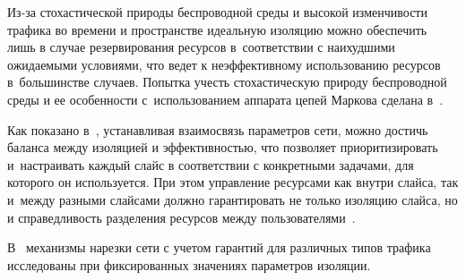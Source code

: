 \begin{multicols}{2}
Из-за стохастической природы беспроводной среды и 
высокой изменчивости трафика во времени и пространстве идеальную 
изоляцию можно обеспечить лишь в случае резервирования ресурсов 
в~соответствии с наихудшими ожидаемыми условиями, что ведет к 
неэффективному использованию ресурсов в~большинстве случаев. 
Попытка 
учесть стохастическую природу беспроводной среды и ее особенности 
с~использованием аппарата цепей Маркова сделана в~\cite{6-mos}. 

Как показано в~\cite{7-mos}, устанавливая взаимосвязь параметров сети, 
можно достичь баланса между изоляцией и эф\-фек\-тив\-ностью, что позволяет 
прио\-ри\-тизировать и~настраивать каждый слайс в со\-от\-вет\-ствии с 
конкретными задачами, для которого он используется. При этом управ\-ле\-ние 
ресурсами как внутри слайса, так и~меж\-ду разными слайсами должно 
гарантировать не только изоляцию слайса, но и справедливость разделения 
ресурсов между пользователями~\cite{8-mos}. 

В~\cite{9-mos} механизмы 
нарезки сети с учетом гарантий для различных типов трафика исследованы 
при фиксированных значениях параметров изоляции.
  

\end{multicols}
